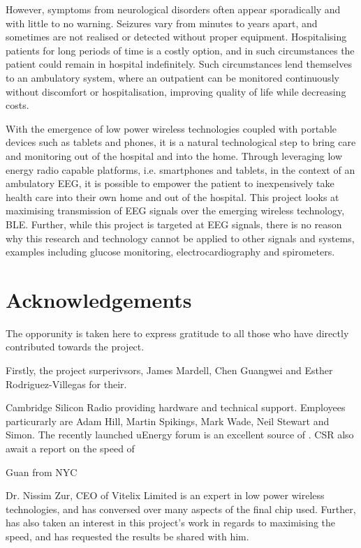\documentclass[]{article}
\begin{document}
However, symptoms from neurological disorders often appear sporadically and with little to no warning. Seizures vary from minutes to years apart, and sometimes are not realised or detected without proper equipment. Hospitalising patients for long periods of time is a costly option, and in such circumstances the patient could remain in hospital indefinitely.  Such circumstances lend themselves to an ambulatory system, where an outpatient can be monitored continuously without discomfort or hospitalisation, improving quality of life while decreasing costs. 

With the emergence of low power wireless technologies coupled with portable devices such as tablets and phones, it is a natural technological step to bring care and monitoring out of the hospital and into the home. Through leveraging low energy radio capable platforms, i.e. smartphones and tablets, in the context of an ambulatory EEG, it is possible to empower the patient to inexpensively take health care into their own home and out of the hospital. This project looks at maximising transmission of \ac{EEG} signals over the emerging wireless technology, \ac{BLE}. Further, while this project is targeted at EEG signals, there is no reason why this research and technology cannot be applied to other signals and systems, examples including glucose monitoring, electrocardiography and spirometers.

\cite{Blanco95}
\clearpage
\tableofcontents
\clearpage

\section{Acknowledgements}
The opporunity is taken here to express gratitude to all those who have directly contributed towards the project. 

Firstly, the project surperivsors, James Mardell, Chen Guangwei and Esther Rodriguez-Villegas for their. 

Cambridge Silicon Radio providing hardware and technical support. Employees particurarly are Adam Hill, Martin Spikings, Mark Wade, Neil Stewart and Simon. The recently launched uEnergy forum is an excellent source of . CSR also await a report on the speed of 

Guan from NYC

Dr. Nissim Zur, CEO of Vitelix Limited is an expert in low power wireless technologies, and has conversed over many aspects of the final chip used. Further, has also taken an interest in this project's work in regards to maximising the speed, and has requested the results be shared with him.
\end{document}
